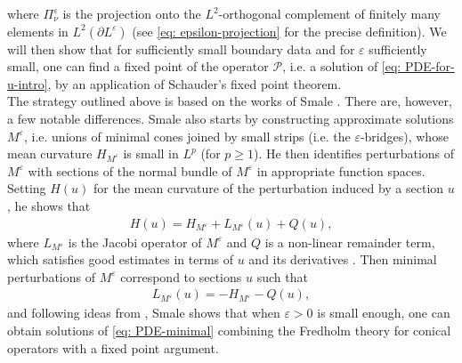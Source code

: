 \documentclass[11pt]{amsart}
\theoremstyle{definition}
\theoremstyle{remark}
\begin{document}
where $\Pi_\nu^\varepsilon$ is the projection onto the $L^2$-orthogonal complement of finitely many elements in $L^2(\partial L^\varepsilon)$ (see \eqref{eq: epsilon-projection} for the precise definition).
We will then show that for sufficiently small boundary data and for $\varepsilon$ sufficiently small, one can find a fixed point of the operator $\mathcal{P}$, i.e. a solution of \eqref{eq: PDE-for-u-intro}, by an application of Schauder's fixed point theorem. \\

The strategy outlined above is based on the works of Smale \cite{Sm89, Sm93}. There are, however, a few notable differences.
Smale also starts by constructing approximate solutions $M^\varepsilon$, i.e. unions of minimal cones joined by small strips (i.e. the $\varepsilon$-bridges), whose mean curvature $H_{M^\varepsilon}$ is small in $L^p$ (for $p\geq 1$). He then identifies perturbations of $M^\varepsilon$ with sections of the normal bundle of $M^\varepsilon$ in appropriate function spaces. Setting $H(u)$ for the mean curvature of the perturbation induced by a section $u$, he shows that
\begin{align*}
    H(u)=H_{M^\varepsilon}+L_{M^\varepsilon}(u)+Q(u),
\end{align*}
where $L_{M^\varepsilon}$ is the Jacobi operator of $M^\varepsilon$ and $Q$ is a non-linear remainder term, which satisfies good estimates in terms of $u$ and its derivatives \cite[see Proposition 3.3]{Sm93}. Then minimal perturbations of $M^\varepsilon$ correspond to sections $u$ such that
\begin{align}\label{eq: PDE-minimal}
    L_{M^\varepsilon}(u)=-H_{M^\varepsilon}-Q(u),
\end{align}
and following ideas from \cite{CHS}, Smale shows that when $\varepsilon>0$ is small enough, one can obtain solutions of \eqref{eq: PDE-minimal} combining the Fredholm theory for conical operators with  a fixed point argument.
\end{document}
